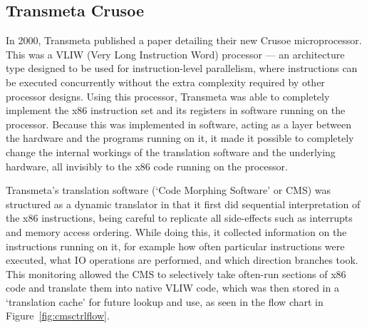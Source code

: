 \subsection{Transmeta Crusoe}
In 2000, Transmeta\cite{TransmetaCodeMorph} published a paper detailing their
new Crusoe microprocessor. This was a VLIW (Very Long Instruction Word)
processor --- an architecture type designed to be used for instruction-level
parallelism, where instructions can be executed concurrently without the extra
complexity required by other processor designs. Using this processor, Transmeta
was able to completely implement the x86 instruction set and its registers in
software running on the processor. Because this was implemented in software,
acting as a layer between the hardware and the programs running on it, it made
it possible to completely change the internal workings of the translation
software and the underlying hardware, all invisibly to the x86 code running on
the processor.

Transmeta's translation software (`Code Morphing Software' or CMS) was
structured as a dynamic translator in that it first did sequential
interpretation of the x86 instructions, being careful to replicate all
side-effects such as interrupts and memory access ordering. While doing this, it
collected information on the instructions running on it, for example how often
particular instructions were executed, what IO operations are performed, and
which direction branches took.  This monitoring allowed the CMS to selectively
take often-run sections of x86 code and translate them into native VLIW code,
which was then stored in a `translation cache' for future lookup and use, as
seen in the flow chart in Figure~\ref{fig:cmsctrlflow}.

